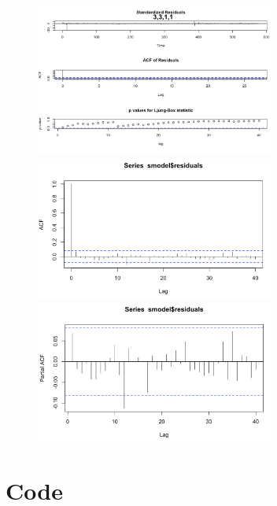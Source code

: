 \documentclass[a4paper,11pt]{article}
\begin{document}
    \newpage
    \begin{figure}[H]
        \centering
        \includegraphics[width=0.7\textwidth]{ha-1_files/figure-markdown_strict/3-3-1-*.png}
        \includegraphics[width=0.7\textwidth]{ha-1_files/figure-markdown_strict/3-3-1-1.1.png}
        \includegraphics[width=0.7\textwidth]{ha-1_files/figure-markdown_strict/3-3-1-1.2.png}
        \label{fig:f10}
    \end{figure}

    
    

    \newpage
    \appendix
    \section{Code}
    
\end{document}
